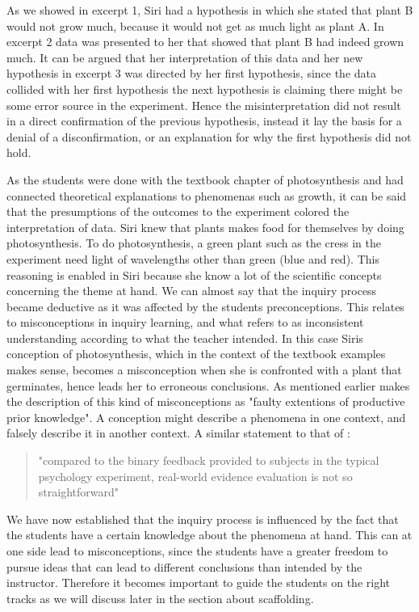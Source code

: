 As we showed in excerpt 1, Siri had a hypothesis in which she stated that plant B would not grow much, because it would not get as much light as plant A. In excerpt 2 data was presented to her that showed that plant B had indeed grown much. It can be argued that her interpretation of this data and her new hypothesis in excerpt 3 was directed by her first hypothesis, since the data collided with her first hypothesis the next hypothesis is claiming there might be some error source in the experiment. Hence the misinterpretation did not result in a direct confirmation of the previous hypothesis, instead it lay the basis for a denial of a disconfirmation, or an explanation for why the first hypothesis did not hold.

As the students were done with the textbook chapter of photosynthesis and had connected theoretical explanations to phenomenas such as growth, it can be said that the presumptions of the outcomes to the experiment colored the interpretation of data. Siri knew that plants makes food for themselves by doing photosynthesis. To do photosynthesis, a green plant such as the cress in the experiment need light of wavelengths other than green (blue and red). This reasoning is enabled in Siri because she know a lot of the scientific concepts concerning the theme at hand. We can almost say that the inquiry process became deductive as it was affected by the students preconceptions. This relates to misconceptions in inquiry learning, and what \citep{gomez2008elementary} refers to as inconsistent understanding according to what the teacher intended. In this case Siris conception of photosynthesis, which in the context of the textbook examples makes sense, becomes a misconception when she is confronted with a plant that germinates, hence leads her to erroneous conclusions. As mentioned earlier \citet{smith1994misconceptions} makes the description of this kind of misconceptions as "faulty extentions of productive prior knowledge". A conception might describe a phenomena in one context, and falsely describe it in another context. A similar statement to that of \citeauthor{klahr1993heuristics}: 

\begin{quote}"compared to the binary feedback provided to subjects in the typical psychology experiment, real-world evidence evaluation is not so straightforward" \citetext{\citet[p. 114]{klahr1993heuristics}, referenced in \citealp{de1998scientific}}
\end{quote}

We have now established that the inquiry process is influenced by the fact that the students have a certain knowledge about the phenomena at hand. This can at one side lead to misconceptions, since the students have a greater freedom to pursue ideas that can lead to different conclusions than intended by the instructor. Therefore it becomes important to guide the students on the right tracks as we will discuss later in the section about scaffolding.

